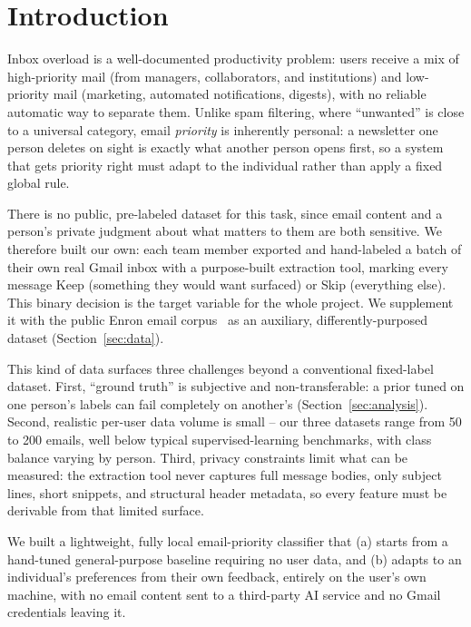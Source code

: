 \documentclass[twoside,twocolumn,10pt]{article}
\begin{document}
\fontsize{12}{14}\selectfont

\section{Introduction}

Inbox overload is a well-documented productivity problem: users receive a mix of high-priority mail (from managers, collaborators, and institutions) and low-priority mail (marketing, automated notifications, digests), with no reliable automatic way to separate them. Unlike spam filtering, where ``unwanted'' is close to a universal category, email \emph{priority} is inherently personal: a newsletter one person deletes on sight is exactly what another person opens first, so a system that gets priority right must adapt to the individual rather than apply a fixed global rule.

There is no public, pre-labeled dataset for this task, since email content and a person's private judgment about what matters to them are both sensitive. We therefore built our own: each team member exported and hand-labeled a batch of their own real Gmail inbox with a purpose-built extraction tool, marking every message Keep (something they would want surfaced) or Skip (everything else). This binary decision is the target variable for the whole project. We supplement it with the public Enron email corpus~\cite{klimt2004enron} as an auxiliary, differently-purposed dataset (Section~\ref{sec:data}).

This kind of data surfaces three challenges beyond a conventional fixed-label dataset. First, ``ground truth'' is subjective and non-transferable: a prior tuned on one person's labels can fail completely on another's (Section~\ref{sec:analysis}). Second, realistic per-user data volume is small -- our three datasets range from 50 to 200 emails, well below typical supervised-learning benchmarks, with class balance varying by person. Third, privacy constraints limit what can be measured: the extraction tool never captures full message bodies, only subject lines, short snippets, and structural header metadata, so every feature must be derivable from that limited surface.

We built a lightweight, fully local email-priority classifier that (a) starts from a hand-tuned general-purpose baseline requiring no user data, and (b) adapts to an individual's preferences from their own feedback, entirely on the user's own machine, with no email content sent to a third-party AI service and no Gmail credentials leaving it.
\end{document}
